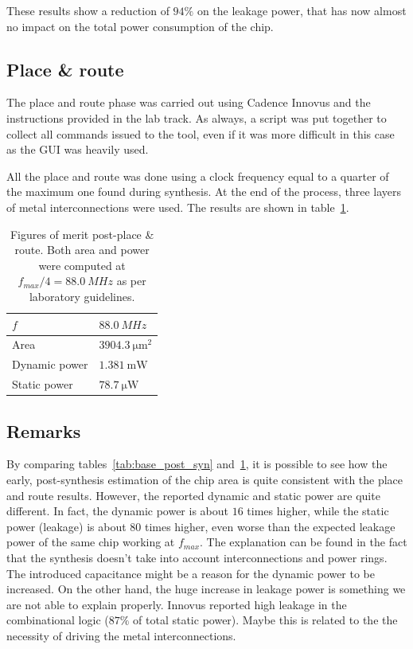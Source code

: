 \documentclass[a4paper]{article}
\begin{document}
These results show a reduction of $94\%$ on the leakage power, that has now almost no impact on the total power consumption of the chip. 

\subsection{Place \& route}
The place and route phase was carried out using Cadence Innovus and the instructions provided in the lab track. As always, a script was put together to collect all commands issued to the tool, even if it was more difficult in this case as the GUI was heavily used. 

All the place and route was done using a clock frequency equal to a quarter of the maximum one found during synthesis. At the end of the process, three layers of metal interconnections were used. The results are shown in table~\ref{tab:base_post_pnr}.

\begin{table}[hbtp]
    \centering
    \begin{tabular}{|l|l|}
    \hline
    $f$           & $\SI{88.0}{MHz}$                \\ \hline
    Area          & $\SI{3904.3}{\micro\meter^2}$   \\ \hline 
    Dynamic power & $\SI{1.381}{\milli\watt}$      \\ \hline 
    Static power  & $\SI{78.7}{\micro\watt}$        \\ \hline
    \end{tabular}
    \caption{Figures of merit post-place \& route. Both area and power were computed at $f_{max}/4 = \SI{88.0}{MHz}$ as per laboratory guidelines.}
    \label{tab:base_post_pnr}
\end{table}

\subsection{Remarks}
\label{sec:base_remarks}

By comparing tables~\ref{tab:base_post_syn} and~\ref{tab:base_post_pnr}, it is possible to see how the early, post-synthesis estimation of the chip area is quite consistent with the place and route results. However, the reported dynamic and static power are quite different. In fact, the dynamic power is about $16$ times higher, while the static power (leakage) is about $80$ times higher, even worse than the expected leakage power of the same chip working at $f_{max}$. The explanation can be found in the fact that the synthesis doesn't take into account interconnections and power rings. The introduced capacitance might be a reason for the dynamic power to be increased. On the other hand, the huge increase in leakage power is something we are not able to explain properly. Innovus reported high leakage in the combinational logic ($87\%$ of total static power). Maybe this is related to the the necessity of driving the metal interconnections. 
\end{document}
